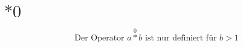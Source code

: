 \documentclass{article}
\begin{document}
\section{$\ast 0$\newline}

\[ \text{Der Operator } a \operatorname*{\ast}^0 b \text{ ist nur definiert f\"ur } b > 1 \]
\end{document}
